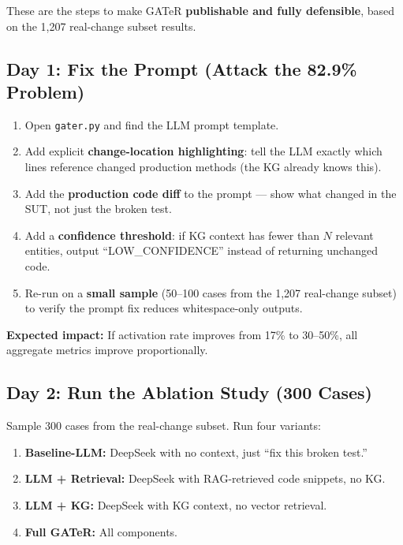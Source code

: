 \documentclass[11pt,a4paper]{article}
\begin{document}
These are the steps to make GATeR \textbf{publishable and
fully defensible}, based on the 1,207 real-change subset results.

\subsection*{Day 1: Fix the Prompt (Attack the 82.9\% Problem)}

\begin{enumerate}[nosep,leftmargin=1.5em]
  \item Open \texttt{gater.py} and find the LLM prompt template.
  \item Add explicit \textbf{change-location highlighting}:
        tell the LLM exactly which lines reference changed
        production methods (the KG already knows this).
  \item Add the \textbf{production code diff} to the prompt ---
        show what changed in the SUT, not just the broken test.
  \item Add a \textbf{confidence threshold}: if KG context has
        fewer than $N$ relevant entities, output
        ``LOW\_CONFIDENCE'' instead of returning unchanged code.
  \item Re-run on a \textbf{small sample} (50--100 cases from the
        1,207 real-change subset) to verify the prompt fix
        reduces whitespace-only outputs.
\end{enumerate}

\textbf{Expected impact:}  If activation rate improves from 17\% to
30--50\%, all aggregate metrics improve proportionally.

\subsection*{Day 2: Run the Ablation Study (300 Cases)}

Sample 300 cases from the real-change subset.  Run four variants:

\begin{enumerate}[nosep,leftmargin=1.5em]
  \item \textbf{Baseline-LLM:} DeepSeek with no context, just
        ``fix this broken test.''
  \item \textbf{LLM + Retrieval:} DeepSeek with RAG-retrieved
        code snippets, no KG.
  \item \textbf{LLM + KG:} DeepSeek with KG context, no vector
        retrieval.
  \item \textbf{Full GATeR:} All components.
\end{enumerate}
\end{document}

